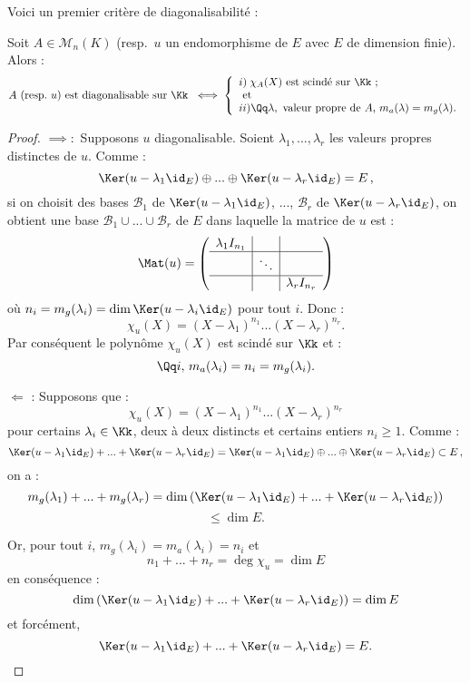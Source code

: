 \documentclass[class=report,crop=false]{standalone}
\begin{document}
Voici un premier critère de diagonalisabilité :
\begin{theoreme}
Soit $A \in \mathcal{M}_n(K)$ (resp.\ $u$ un endomorphisme de $E$ avec $E$ de dimension finie). Alors :
\[A \mbox{ (resp.\ $u$) est diagonalisable sur $\Kk$ } \iff \left\{\begin{array}{l}
i)\; \chi_A(X) \mbox{ est scindé sur $\Kk$ ;}\\
\text{ et }\\
ii)\Qq \lambda,\mbox{ valeur propre de $A$, } m_a(\lambda) = m_g(\lambda).
\end{array}\right.\]
\end{theoreme}

\begin{proof}
$\mathbf \implies :$ Supposons $u$  diagonalisable. Soient $\lambda_1,..., \lambda_r$ les valeurs propres distinctes de $u$. Comme :
\[\Ker(u-\lambda_1\id_E) \oplus ... \oplus \Ker(u-\lambda_r\id_E) =E\,,\]
si on choisit des bases $\mathcal{B}_1$ de $\Ker(u-\lambda_1\id_E) $, ..., $\mathcal{B}_r$ de $\Ker(u-\lambda_r\id_E)$, on obtient une base $\mathcal{B}_1\cup ...\cup \mathcal{B}_r$ de $E$ dans laquelle la matrice de $u$ est :
\[\Mat(u) = \left(\begin{array}{c|c|c}
\lambda_1I_{n_1}& &\\\hline
&\ddots&\\\hline
&&\lambda_r I_{n_r}
\end{array}\right)\] où $n_i =m_g(\lambda_i)=\dim \Ker(u-\lambda_i\id_E)$ pour tout $i$. Donc :
\[\chi_u(X) = (X-\lambda_1)^{n_1}...(X-\lambda_r)^{n_r} .\]
Par conséquent le polynôme $\chi_u(X) $ est scindé sur $\Kk$ et :
\[\Qq i, \, m_a(\lambda_i) = n_i = m_g(\lambda_i) .\]

$\mathbf \Leftarrow$ :  Supposons que :
\[\chi_u(X) = (X-\lambda_1)^{n_1}...(X-\lambda_r)^{n_r}\]
pour certains $\lambda_i \in \Kk$, deux à deux distincts et certains entiers $n_i \ge 1$. 
Comme :
\[\Ker(u-\lambda_1\id_E) + ... + \Ker(u-\lambda_r\id_E) = \Ker(u-\lambda_1\id_E) \oplus ... \oplus \Ker(u-\lambda_r\id_E) \subset E\,,\]
on a :
\[m_g(\lambda_1) + ... + m_g(\lambda_r) = \dim \left(\Ker(u-\lambda_1\id_E) + ... + \Ker(u-\lambda_r\id_E)\right)\]
\[\le \dim E .\]

Or, pour tout $i$, $m_g(\lambda_i) = m_a(\lambda_i) = n_i$ et \[n_1 + ... + n_r =\deg \chi_u = \dim E\]
en conséquence : 
\[
 \dim \left(\Ker(u-\lambda_1\id_E) + ... + \Ker(u-\lambda_r\id_E)\right) = \dim E \]
et forcément,  \[\Ker(u-\lambda_1\id_E) + ... + \Ker(u-\lambda_r\id_E) = E .\]

\end{proof}
\end{document}
